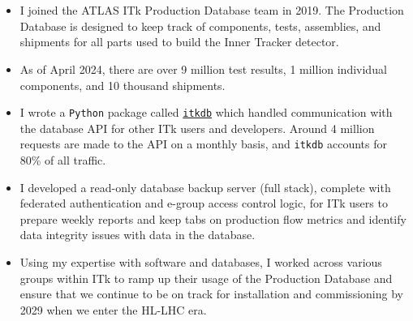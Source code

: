 \\

\\

\begin{itemize}
	\setlength{\itemsep}{0em}
	\item I joined the ATLAS ITk Production Database team in 2019. The Production Database is designed to keep track of components, tests, assemblies, and shipments for all parts used to build the Inner Tracker detector.
	\item As of April 2024, there are over 9 million test results, 1 million individual components, and 10 thousand shipments.
	\item I wrote a \texttt{Python} package called \href{https://itkdb.docs.cern.ch/latest/}{\texttt{itkdb}} which handled communication with the database API for other ITk users and developers. Around 4 million requests are made to the API on a monthly basis, and \texttt{itkdb} accounts for 80\% of all traffic.
	\item I developed a read-only database backup server (full stack), complete with federated authentication and e-group access control logic, for ITk users to prepare weekly reports and keep tabs on production flow metrics and identify data integrity issues with data in the database.
	\item Using my expertise with software and databases, I worked across various groups within ITk to ramp up their usage of the Production Database and ensure that we continue to be on track for installation and commissioning by 2029 when we enter the HL-LHC era.
\end{itemize}

\\

